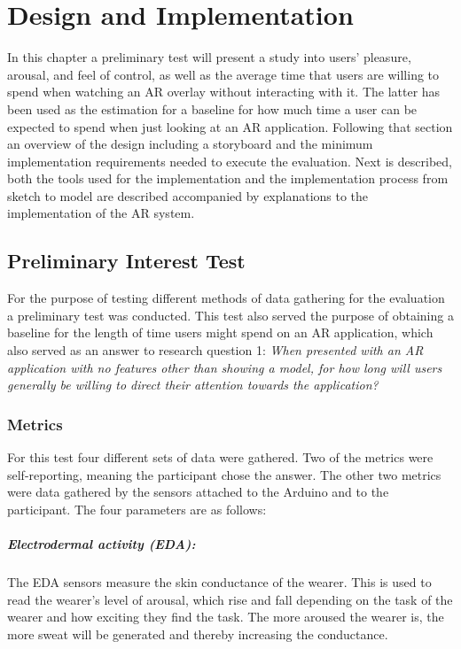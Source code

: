 \chapter{Design and Implementation}\label{ch:implementation}
In this chapter a preliminary test will present a study into users’ pleasure, arousal, and feel of control, as well as the average time that users are willing to spend when watching an AR overlay without interacting with it. The latter has been used as the estimation for a baseline for how much time a user can be expected to spend when just looking at an AR application. Following that section an overview of the design including a storyboard and the minimum implementation requirements needed to execute the evaluation. Next is described, both the tools used for the implementation and the implementation process from sketch to model are described accompanied by explanations to the implementation of the AR system. 

\section{Preliminary Interest Test}
For the purpose of testing different methods of data gathering for the evaluation a preliminary test was conducted. This test also served the purpose of obtaining a baseline for the length of time users might spend on an AR application, which also served as an answer to research question 1: \textit{When presented with an AR application with no features other than showing a model, for how long will users generally be willing to direct their attention towards the application?}

\subsection{Metrics}\label{subsec:premetrics}
For this test four different sets of data were gathered. Two of the metrics were self-reporting, meaning the participant chose the answer. The other two metrics were data gathered by the sensors attached to the Arduino and to the participant. The four parameters are as follows:
\paragraph{Electrodermal activity (EDA):} The EDA sensors measure the skin conductance of the wearer. This is used to read the wearer’s level of arousal, which rise and fall depending on the task of the wearer and how exciting they find the task. The more aroused the wearer is, the more sweat will be generated and thereby increasing the conductance.
